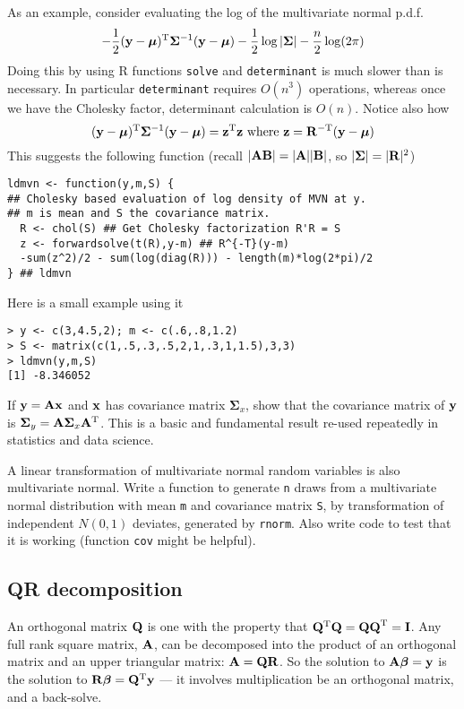 \documentclass[10pt] {article}
\newcommand{\bp}{{\vm \beta}}
\newcommand{\vm}{\bm} %
\newcommand{\ts}{^{\rm T}}
\newcommand{\its}{^{-\rm T}}
\theoremstyle{definition}
\begin{document}
As an example, consider evaluating the log of the multivariate normal p.d.f.
$$
- \frac{1}{2}({\bf y} - {\bm \mu})\ts {\bm \Sigma}^{-1} ({\bf y} - {\bm \mu}) - \frac{1}{2} \log |{\bm \Sigma}| - \frac{n}{2}\log(2 \pi)
$$ 
Doing this by using R functions {\tt solve} and {\tt determinant} is much slower than is necessary. In particular {\tt determinant} requires $O(n^3)$ operations, whereas once we have the Cholesky factor, determinant calculation is $O(n)$. Notice also how 
$$
({\bf y} - {\bm \mu})\ts {\bm \Sigma}^{-1} ({\bf y} - {\bm \mu}) = {\bf z}\ts {\bf z} \text{   where  } {\bf z} = {\bf R}\its ({\bf y} - {\bm \mu})
$$
This suggests the following function (recall $|{\bf AB}| = |{\bf A}||{\bf B}|$, so $|{\bm \Sigma}|=|{\bf R}|^2$)
\begin{lstlisting}
ldmvn <- function(y,m,S) { 
## Cholesky based evaluation of log density of MVN at y. 
## m is mean and S the covariance matrix.
  R <- chol(S) ## Get Cholesky factorization R'R = S
  z <- forwardsolve(t(R),y-m) ## R^{-T}(y-m)
  -sum(z^2)/2 - sum(log(diag(R))) - length(m)*log(2*pi)/2
} ## ldmvn
\end{lstlisting}
Here is a small example using it
\begin{lstlisting}
> y <- c(3,4.5,2); m <- c(.6,.8,1.2)
> S <- matrix(c(1,.5,.3,.5,2,1,.3,1,1.5),3,3)
> ldmvn(y,m,S)
[1] -8.346052
\end{lstlisting}

 If ${\bf y } = {\bf Ax}$ and $\bf x$ has covariance matrix ${\bm \Sigma}_x$, show that the covariance matrix of $\bf y$ is ${\bm \Sigma}_y = {\bf A}{\bm \Sigma}_x{\bf A}\ts$. This is a basic and fundamental result re-used repeatedly in statistics and data science.  

 A linear transformation of multivariate normal random variables is also multivariate normal. Write a function to generate {\tt n} draws from a multivariate normal distribution with mean {\tt m} and covariance matrix {\tt S}, by transformation of independent $N(0,1)$ deviates, generated by {\tt rnorm}. Also write code to test that it is working (function {\tt cov} might be helpful).  


\subsection{QR decomposition \label{sec:qr}}

An orthogonal matrix $\bf Q$ is one with the property that ${\bf Q}\ts {\bf Q} = {\bf QQ}\ts = {\bf I}$. Any full rank square matrix, $\bf A$, can be decomposed into the product of an orthogonal matrix and an upper triangular matrix: ${\bf A} = {\bf QR}$. So the solution to ${\bf A}\bp = {\bf y}$ is the solution to ${\bf R}\bp = {\bf Q}\ts {\bf y}$ --- it involves multiplication be an orthogonal matrix, and a back-solve. 
\end{document}
